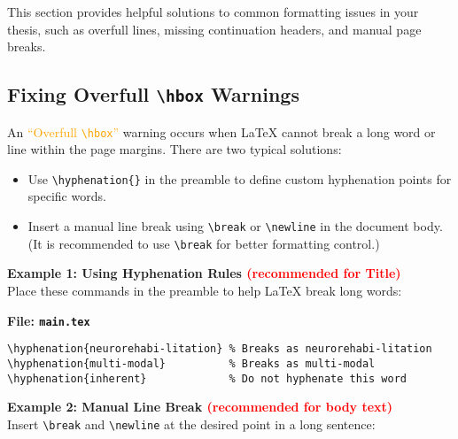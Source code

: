\documentclass{VISTEC}
\begin{document}
\begin{paragraph}
This section provides helpful solutions to common formatting issues in your thesis, such as overfull lines, missing continuation headers, and manual page breaks.
\end{paragraph}

\subsection{Fixing Overfull \texttt{\textbackslash hbox} Warnings}
\label{manual:overflow-fix}

\begin{subparagraph}
An \textcolor{orange}{``Overfull \texttt{\textbackslash hbox}''} warning occurs when LaTeX cannot break a long word or line within the page margins. There are two typical solutions:
\end{subparagraph}

\begin{itemize}[leftmargin=\subparitemindent]
  \item Use \verb|\hyphenation{}| in the preamble to define custom hyphenation points for specific words.
  \item Insert a manual line break using \verb|\break| or \verb|\newline| in the document body. (It is recommended to use \verb|\break| for better formatting control.)
\end{itemize}


\begin{subparagraph}
\textbf{Example 1: Using Hyphenation Rules \textcolor{red}{(recommended for Title)}}\\

Place these commands in the preamble to help LaTeX break long words:
\end{subparagraph}

\noindent\textbf{File: \texttt{main.tex}}\vspace{-1.5em}
\begin{verbatim}
\hyphenation{neurorehabi-litation} % Breaks as neurorehabi-litation
\hyphenation{multi-modal}          % Breaks as multi-modal
\hyphenation{inherent}             % Do not hyphenate this word
\end{verbatim}


\begin{subparagraph}
\textbf{Example 2: Manual Line Break \textcolor{red}{(recommended for body text)}}\\

Insert \verb|\break| and \verb|\newline| at the desired point in a long sentence:
\end{subparagraph}
\end{document}
